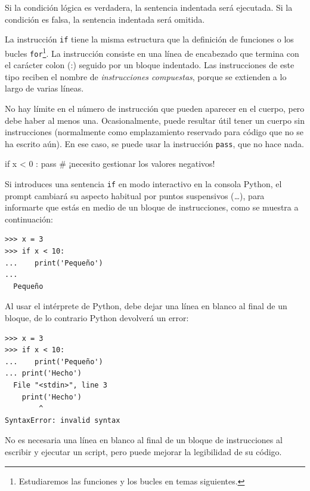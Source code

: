 Si la condición lógica es verdadera, la sentencia indentada será
ejecutada. Si la condición es falsa, la sentencia indentada será
omitida.

 

La instrucción \texttt{if} tiene la misma estructura que la definición
de funciones o los bucles \texttt{for}\footnote{Estudiaremos las
  funciones y los bucles en temas siguientes.}. La
instrucción consiste en una línea de encabezado que termina con el
carácter colon (:) seguido por un bloque indentado. Las instrucciones de
este tipo reciben el nombre de \emph{instrucciones compuestas}, porque
se extienden a lo largo de varias líneas.

No hay límite en el número de instrucción que pueden aparecer en el
cuerpo, pero debe haber al menos una. Ocasionalmente, puede resultar
útil tener un cuerpo sin instrucciones (normalmente como emplazamiento
reservado para código que no se ha escrito aún). En ese caso, se puede
usar la instrucción \texttt{pass}, que no hace nada.

 

\begin{python}[frame=single]
if x < 0 :
    pass          # ¡necesito gestionar los valores negativos!
\end{python}

Si introduces una sentencia \texttt{if} en modo interactivo en la consola Python, el
prompt cambiará su aspecto habitual por puntos suspensivos (\emph{\ldots{}}), para informarte
que estás en medio de un bloque de instrucciones, como se muestra a
continuación:


\begin{Verbatim}[frame=single]
>>> x = 3
>>> if x < 10:
...    print('Pequeño')
...
  Pequeño
\end{Verbatim}

Al usar el intérprete de Python, debe dejar una línea en blanco al final
de un bloque, de lo contrario Python devolverá un error:

\begin{Verbatim}[frame=single]
>>> x = 3
>>> if x < 10:
...    print('Pequeño')
... print('Hecho')
  File "<stdin>", line 3
    print('Hecho')
        ^
SyntaxError: invalid syntax
\end{Verbatim}

No es necesaria una línea en blanco al final de un bloque de
instrucciones al escribir y ejecutar un script, pero puede mejorar la
legibilidad de su código.


